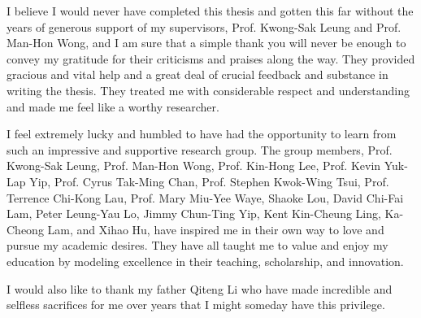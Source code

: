 I believe I would never have completed this thesis and gotten this far without the years of generous support of my supervisors, Prof. Kwong-Sak Leung and Prof. Man-Hon Wong, and I am sure that a simple thank you will never be enough to convey my gratitude for their criticisms and praises along the way. They provided gracious and vital help and a great deal of crucial feedback and substance in writing the thesis. They treated me with considerable respect and understanding and made me feel like a worthy researcher.

I feel extremely lucky and humbled to have had the opportunity to learn from such an impressive and supportive research group. The group members, Prof. Kwong-Sak Leung, Prof. Man-Hon Wong, Prof. Kin-Hong Lee, Prof. Kevin Yuk-Lap Yip, Prof. Cyrus Tak-Ming Chan, Prof. Stephen Kwok-Wing Tsui, Prof. Terrence Chi-Kong Lau, Prof. Mary Miu-Yee Waye, Shaoke Lou, David Chi-Fai Lam, Peter Leung-Yau Lo, Jimmy Chun-Ting Yip, Kent Kin-Cheung Ling, Ka-Cheong Lam, and Xihao Hu, have inspired me in their own way to love and pursue my academic desires. They have all taught me to value and enjoy my education by modeling excellence in their teaching, scholarship, and innovation.

I would also like to thank my father Qiteng Li who have made incredible and selfless sacrifices for me over years that I might someday have this privilege.

